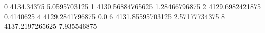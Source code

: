 0 4134.34375 5.0595703125
1 4130.56884765625 1.28466796875
2 4129.6982421875 0.4140625
4 4129.2841796875 0.0
6 4131.85595703125 2.57177734375
8 4137.2197265625 7.935546875
